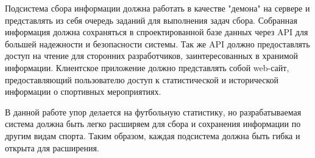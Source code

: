 Подсистема сбора информации должна работать в качестве "демона" на сервере и представлять из себя очередь заданий для выполнения задач сбора. Собранная информация должна сохраняться в спроектированной базе данных через API для большей надежности и безопасности системы. Так же API должно предоставлять доступ на чтение для сторонних разработчиков, заинтересованных в хранимой информации. Клиентское приложение должно представлять собой web-сайт, предоставляющий пользователю доступ к статистической и исторической информации о спортивных мероприятиях. 

В данной работе упор делается на футбольную статистику, но разрабатываемая система должна быть легко расширяем для сбора и сохранения информации по другим видам спорта. Таким образом, каждая подсистема должна быть гибка и открыта для расширения.
